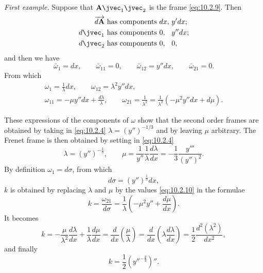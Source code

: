 \somespace

\emph{First example.} Suppose that $\mathbf{A}\jvec_{1}\jvec_{2}$ is the frame \eqref{eq:10.2.9}. Then
\[
\begin{alignedat}{10}
  \overrightarrow{d\mathbf{A}}\text{ has components }&dx,\ &&y'dx;\\
  {d\jvec_{1}}\text{ has components }&0,&&y''dx;\\
  {d\jvec_{2}}\text{ has components }&0,&&0,\\
\end{alignedat}
\]
and then we have
\[
\bar\omega_{1}=dx,\qquad\bar\omega_{11}=0,\qquad\bar\omega_{12}=y''dx,\qquad\bar\omega_{21}=0.
\]
From which
\begin{gather*}
  \omega_{1}=\frac{1}{\lambda}dx,\qquad\omega_{12}=\lambda^{2}y''dx,\\
  \omega_{11}=-\mu y''dx+\frac{d\lambda}{\lambda},\qquad\omega_{21}=\frac{1}{\lambda^{2}}=\frac{1}{\lambda^{2}}(-\mu^{2}y''dx+d\mu).
\end{gather*}

These expressions of the components of $\omega$ show that the second order frames are obtained by taking in \eqref{eq:10.2.4} $\lambda=(y'')^{-1/3}$ and by leaving $\mu$ arbitrary. The Frenet frame is then obtained by setting in \eqref{eq:10.2.4}
\begin{equation}
  \label{eq:10.2.10}
  \lambda=(y'')^{-\frac{1}{3}},\qquad\mu=\frac{1}{y''}\frac{1}{\lambda}\frac{d\lambda}{dx}=-\frac{1}{3}\frac{y'''}{(y'')^{2}}.
\end{equation}
By definition $\omega_{1}=d\sigma$, from which
\begin{equation}
  \label{eq:10.2.11}
  d\sigma=(y'')^{\frac{1}{3}}dx,
\end{equation}
$k$ is obtained by replacing $\lambda$ and $\mu$ by the values \eqref{eq:10.2.10} in the formulae
\[
k=\frac{\omega_{21}}{d\sigma}=\frac{1}{\lambda}\left(-\mu^{2}y''+\frac{d\mu}{dx}\right).
\]
It becomes
\[
k=-\frac{\mu}{\lambda^{2}}\frac{d\lambda}{dx}+\frac{1}{\lambda}\frac{d\mu}{dx}=\frac{d}{dx}\left(\frac{\mu}{\lambda}\right)=\frac{d}{dx}\left(\lambda\frac{d\lambda}{dx}\right)=\frac{1}{2}\frac{d^{2}(\lambda^{2})}{dx^{2}},
\]
and finally
\begin{equation}
  \label{eq:10.2.12}
  k=\frac{1}{2}\left(\left.y''\right.^{-\frac{2}{3}}\right)''.
\end{equation}

\somespace


